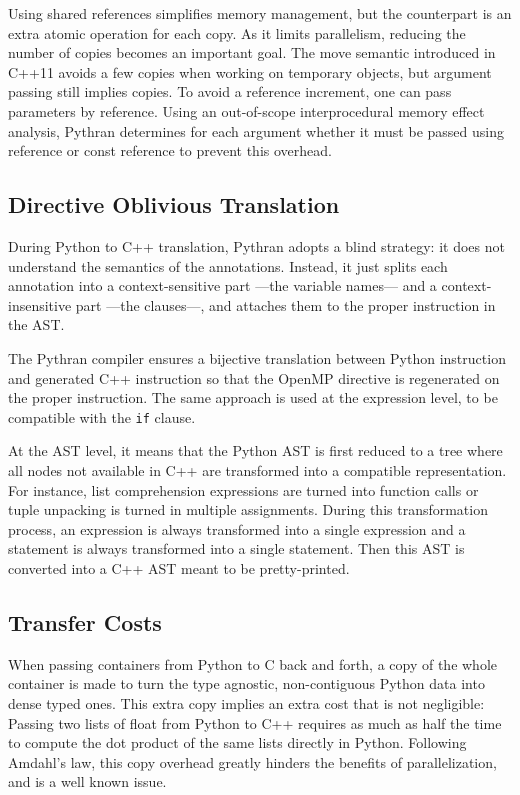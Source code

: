 \documentclass{sigplanconf}
\begin{document}
Using shared references simplifies memory management, but the counterpart is an
extra atomic operation for each copy. As it limits parallelism, reducing the
number of copies becomes an important goal. The move semantic introduced in
C++11 avoids a few copies when working on temporary objects, but argument
passing still implies copies. To avoid a reference increment, one can pass
parameters by reference. Using an out-of-scope interprocedural memory effect
analysis, Pythran determines for each argument whether it must be passed using
reference or const reference to prevent this overhead.

\subsection{Directive Oblivious Translation}

During Python to C++ translation, Pythran adopts a blind strategy: it does not
understand the semantics of the annotations. Instead, it just splits each
annotation into a context-sensitive part ---the variable names--- and a
context-insensitive part ---the clauses---, and attaches them to the proper
instruction in the AST.

The Pythran compiler ensures a bijective translation between Python instruction
and generated C++ instruction so that the OpenMP directive is regenerated on the
proper instruction. The same approach is used at the expression level, to be
compatible with the \texttt{if} clause.

At the AST level, it means that the Python AST is first reduced to a tree where
all nodes not available in C++ are transformed into a compatible representation.
For instance, list comprehension expressions are turned into function calls or
tuple unpacking is turned in multiple assignments. During this transformation
process, an expression is always transformed into a single expression and a
statement is always transformed into a single statement. Then this AST is
converted into a C++ AST meant to be pretty-printed.


\subsection{Transfer Costs}

When passing containers from Python to C back and forth, a copy of the whole
container is made to turn the type agnostic, non-contiguous Python data into
dense typed ones. This extra copy implies an extra cost that is not negligible:
Passing two lists of float from Python to C++ requires as much as half the time
to compute the dot product of the same lists directly in Python. Following
Amdahl's law, this copy overhead greatly hinders the benefits of
parallelization, and is a well known issue.
\end{document}
